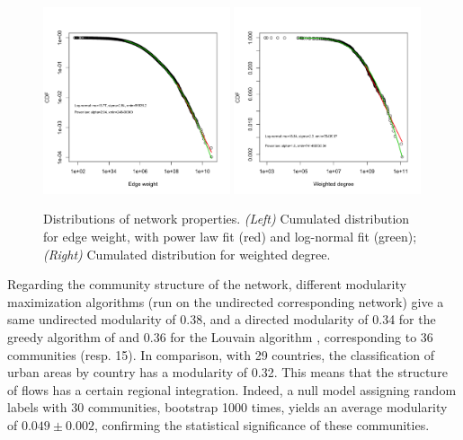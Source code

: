 \documentclass[11pt]{article}
\begin{document}
\begin{figure}
    \centering
    \includegraphics[width=0.49\textwidth]{figures/edgeweight.png}
    \includegraphics[width=0.49\textwidth]{figures/degreeDistr.png}
    \caption{Distributions of network properties. \textit{(Left)} Cumulated distribution for edge weight, with power law fit (red) and log-normal fit (green); \textit{(Right)} Cumulated distribution for weighted degree.}
    \label{fig:nwdist}
\end{figure}


Regarding the community structure of the network, different modularity maximization algorithms (run on the undirected corresponding network) give a same undirected modularity of 0.38, and a directed modularity \citep{nicosia2009extending} of 0.34 for the greedy algorithm of \citep{clauset2004finding} and 0.36 for the Louvain algorithm \citep{blondel2008fast}, corresponding to 36 communities (resp. 15). In comparison, with 29 countries, the classification of urban areas by country has a modularity of 0.32. This means that the structure of flows has a certain regional integration. Indeed, a null model assigning random labels with 30 communities, bootstrap 1000 times, yields an average modularity of $0.049 \pm 0.002$, confirming the statistical significance of these communities.
\end{document}
